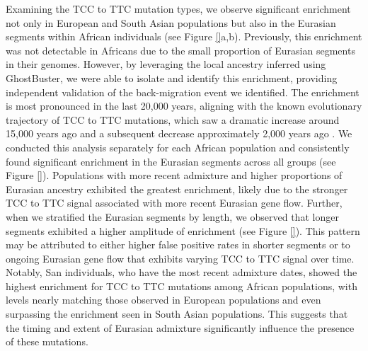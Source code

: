 Examining the TCC to TTC mutation types, we observe significant enrichment not only in European and South Asian populations but also in the Eurasian segments within African individuals (see Figure \ref{}a,b). Previously, this enrichment was not detectable in Africans due to the small proportion of Eurasian segments in their genomes. However, by leveraging the local ancestry inferred using GhostBuster, we were able to isolate and identify this enrichment, providing independent validation of the back-migration event we identified. The enrichment is most pronounced in the last 20,000 years, aligning with the known evolutionary trajectory of TCC to TTC mutations, which saw a dramatic increase around 15,000 years ago and a subsequent decrease approximately 2,000 years ago \cite{harris2017rapid}. We conducted this analysis separately for each African population and consistently found significant enrichment in the Eurasian segments across all groups (see Figure \ref{}). Populations with more recent admixture and higher proportions of Eurasian ancestry exhibited the greatest enrichment, likely due to the stronger TCC to TTC signal associated with more recent Eurasian gene flow. Further, when we stratified the Eurasian segments by length, we observed that longer segments exhibited a higher amplitude of enrichment (see Figure \ref{}). This pattern may be attributed to either higher false positive rates in shorter segments or to ongoing Eurasian gene flow that exhibits varying TCC to TTC signal over time. Notably, San individuals, who have the most recent admixture dates, showed the highest enrichment for TCC to TTC mutations among African populations, with levels nearly matching those observed in European populations and even surpassing the enrichment seen in South Asian populations. This suggests that the timing and extent of Eurasian admixture significantly influence the presence of these mutations.

